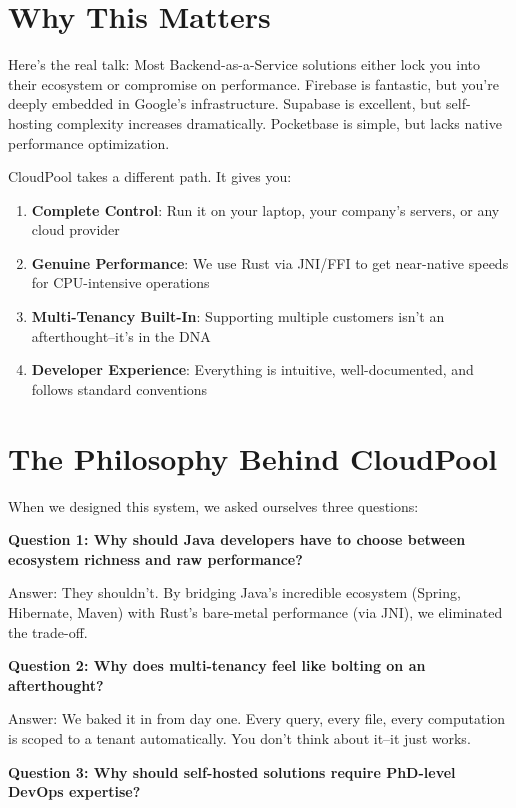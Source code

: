 \documentclass[11pt,a4paper]{report}
\begin{document}
\section{Why This Matters}


Here's the real talk: Most Backend-as-a-Service solutions either lock you into their ecosystem or compromise on performance. Firebase is fantastic, but you're deeply embedded in Google's infrastructure. Supabase is excellent, but self-hosting complexity increases dramatically. Pocketbase is simple, but lacks native performance optimization.

CloudPool takes a different path. It gives you:

\begin{enumerate}
\item \textbf{Complete Control}: Run it on your laptop, your company's servers, or any cloud provider
\item \textbf{Genuine Performance}: We use Rust via JNI/FFI to get near-native speeds for CPU-intensive operations
\item \textbf{Multi-Tenancy Built-In}: Supporting multiple customers isn't an afterthought--it's in the DNA
\item \textbf{Developer Experience}: Everything is intuitive, well-documented, and follows standard conventions

\end{enumerate}

\section{The Philosophy Behind CloudPool}


When we designed this system, we asked ourselves three questions:

\textbf{Question 1: Why should Java developers have to choose between ecosystem richness and raw performance?}

Answer: They shouldn't. By bridging Java's incredible ecosystem (Spring, Hibernate, Maven) with Rust's bare-metal performance (via JNI), we eliminated the trade-off.

\textbf{Question 2: Why does multi-tenancy feel like bolting on an afterthought?}

Answer: We baked it in from day one. Every query, every file, every computation is scoped to a tenant automatically. You don't think about it--it just works.

\textbf{Question 3: Why should self-hosted solutions require PhD-level DevOps expertise?}
\end{document}
